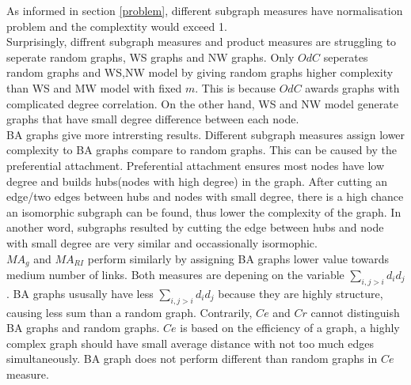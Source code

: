 \documentclass[12pt]{article}
\begin{document}
\noindent
As informed in section \ref{problem}, different subgraph measures have normalisation problem and the complextity would exceed 1.\\
Surprisingly, diffrent subgraph measures and product measures are struggling to seperate random graphs, WS graphs and NW graphs. Only $OdC$ seperates random graphs and WS,NW model by giving random graphs higher complexity than WS and MW model with fixed $m$. This is because $OdC$ awards graphs with complicated degree correlation. On the other hand, WS and NW model generate graphs that have small degree difference between each node.\\
BA graphs give more intrersting results. Different subgraph measures assign lower complexity to BA graphs compare to random graphs. This can be caused by the preferential attachment. Preferential attachment ensures most nodes have low degree and builds hubs(nodes with high degree) in the graph. After cutting an edge/two edges between hubs and nodes with small degree, there is a high chance an isomorphic subgraph can be found, thus lower the complexity of the graph. In another word, subgraphs resulted by cutting the edge between hubs and node with small degree are very similar and occassionally isormophic.\\
$MA_g$ and $MA_{RI}$ perform similarly by assigning BA graphs lower value towards medium number of links. Both measures are depening on the variable $\sum_{i,j>i}d_id_j$. BA graphs ususally have less $\sum_{i,j>i}d_id_j$ because they are highly structure, causing less sum than a random graph. Contrarily, $Ce$ and $Cr$ cannot distinguish BA graphs and random graphs. $Ce$ is based on the efficiency of a graph, a highly complex graph should have small average distance with not too much edges simultaneously. BA graph does not perform different than random graphs in $Ce$ measure.\\
\end{document}
